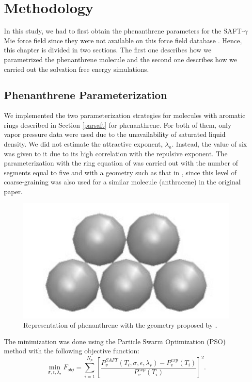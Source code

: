 \chapter{Methodology} %

\label{Chapter4} %

In this study, we had to first obtain the phenanthrene parameters for the SAFT-$\gamma$ Mie force field since they were not available on this force field database \cite{ervik2016}. Hence, this chapter is divided in two sections. The first one describes how we parametrized the phenanthrene molecule and the second one describes how we carried out the solvation free energy simulations. 

\section{Phenanthrene Parameterization}\label{parame}

We implemented the two parameterization strategies for molecules with aromatic rings described in Section \ref{parsaft} for phenanthrene. For both of them, only vapor pressure data \cite{pvphen} were used due to the unavailability of saturated liquid density. We did not estimate the attractive exponent, $\lambda _{a}$. Instead, the value of six was given to it due to its high correlation with the repulsive exponent. The parameterization with the ring equation of  was carried out with the number of segments equal to five and with a geometry such as that in , since this level of coarse-graining was also used for a similar molecule (anthracene) in the original paper.
\begin{figure}[th]
	\centering
	\includegraphics[width=0.25\linewidth]{Figures/fen5}
	\caption{Representation of phenanthrene with the geometry proposed by . }
	\label{fig:fen5}
\end{figure}

The minimization was done using the Particle Swarm Optimization (PSO)  method \cite{pso} with the following objective function:
\begin{equation}
\min\limits_{\sigma,\epsilon,\lambda_{r}} F_{obj} = \sum_{i=1}^{N_{p}} \left[\frac{P_{v}^{SAFT}(T_{i},\sigma,\epsilon,\lambda_{r})-P_{v}^{exp}(T_{i})}{P_{v}^{exp}(T_{i})} \right]^2 .
\label{eqn:fobjm}
\end{equation}

